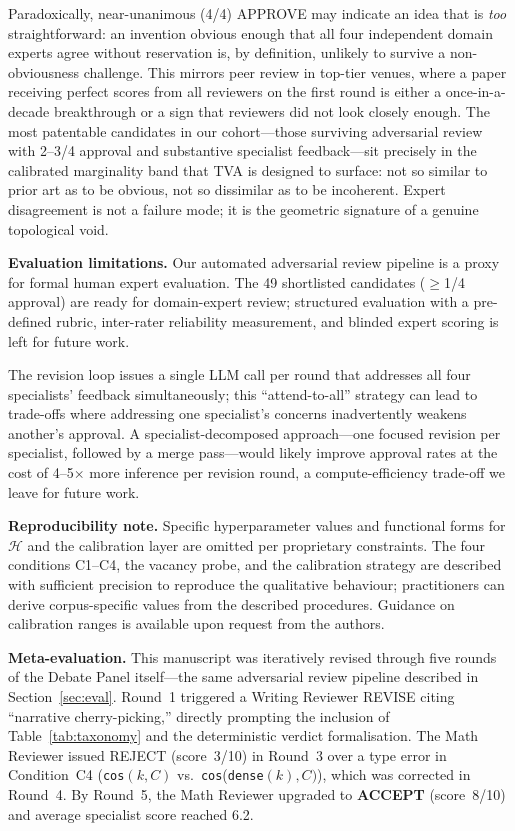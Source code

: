 \documentclass[11pt,twocolumn]{article}
\begin{document}
Paradoxically, near-unanimous (4/4) APPROVE may indicate an idea
that is \emph{too} straightforward: an invention obvious enough that
all four independent domain experts agree without reservation is, by
definition, unlikely to survive a non-obviousness challenge.
This mirrors peer review in top-tier venues, where a paper receiving
perfect scores from all reviewers on the first round is either a
once-in-a-decade breakthrough or a sign that reviewers did not look
closely enough.  The most patentable candidates in our cohort---those
surviving adversarial review with 2--3/4 approval and substantive
specialist feedback---sit precisely in the calibrated marginality band
that TVA is designed to surface: not so similar to prior art as to be
obvious, not so dissimilar as to be incoherent.  Expert disagreement is
not a failure mode; it is the geometric signature of a genuine
topological void.

\textbf{Evaluation limitations.}  Our automated adversarial review
pipeline is a proxy for formal human expert evaluation.
The 49 shortlisted candidates ($\geq$1/4 approval) are ready for
domain-expert review; structured evaluation with a pre-defined rubric,
inter-rater reliability measurement, and blinded expert scoring is
left for future work.

The revision loop issues a single LLM call per round that addresses
all four specialists' feedback simultaneously; this ``attend-to-all''
strategy can lead to trade-offs where addressing one specialist's
concerns inadvertently weakens another's approval.
A specialist-decomposed approach---one focused revision per specialist,
followed by a merge pass---would likely improve approval rates at the
cost of 4--5$\times$ more inference per revision round, a
compute-efficiency trade-off we leave for future work.

\textbf{Reproducibility note.}  Specific hyperparameter values and
functional forms for $\mathcal{H}$ and the calibration layer are
omitted per proprietary constraints.  The four conditions C1--C4,
the vacancy probe, and the calibration strategy are described
with sufficient precision to reproduce the qualitative behaviour;
practitioners can derive corpus-specific values from the
described procedures.  Guidance on calibration ranges is
available upon request from the authors.

\textbf{Meta-evaluation.}
This manuscript was iteratively revised through five rounds of the
Debate Panel itself---the same adversarial review pipeline described
in Section~\ref{sec:eval}.  Round~1 triggered a Writing Reviewer
REVISE citing ``narrative cherry-picking,'' directly prompting the
inclusion of Table~\ref{tab:taxonomy} and the deterministic verdict
formalisation.  The Math Reviewer issued REJECT (score~3/10) in
Round~3 over a type error in Condition~C4 (\texttt{cos}$(k, C)$
vs.\ \texttt{cos}(\texttt{dense}$(k), C)$), which was corrected in
Round~4.  By Round~5, the Math Reviewer upgraded to \textbf{ACCEPT}
(score~8/10) and average specialist score reached 6.2.
\end{document}
